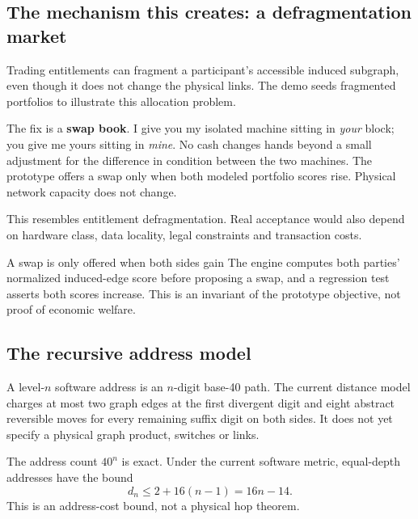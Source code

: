 \documentclass[11pt,letterpaper]{article}
\newcommand{\tagbox}[3]{\tikz[baseline=(X.base)]{\node[inner xsep=3.5pt,inner ysep=1.4pt,rounded corners=1.6pt,fill=#1,text=#2,font=\bfseries\sffamily\tiny] (X) {#3};}}
\newcommand{\MODELLED}{\tagbox{amberlite}{amber!55!black}{MODELLED}}
\begin{document}
\subsection{The mechanism this creates: a defragmentation market}

\begin{plainbox}[]
Trading entitlements can fragment a participant's accessible induced subgraph,
even though it does not change the physical links. The demo seeds fragmented
portfolios to illustrate this allocation problem. \MODELLED
\end{plainbox}

The fix is a \textbf{swap book}. I give you my isolated machine sitting in
\emph{your} block; you give me yours sitting in \emph{mine}. No cash changes
hands beyond a small adjustment for the difference in condition between the two
machines. The prototype offers a swap only when both modeled portfolio scores
rise. Physical network capacity does not change.

This resembles entitlement defragmentation. Real acceptance would also depend
on hardware class, data locality, legal constraints and transaction costs.

\begin{keybox}{A swap is only offered when both sides gain}
The engine computes both parties' normalized induced-edge score before
proposing a swap, and a regression test asserts both scores increase. This is
an invariant of the prototype objective, not proof of economic welfare.
\end{keybox}

\subsection{The recursive address model}

\begin{plainbox}[]
A level-$n$ software address is an $n$-digit base-40 path. The current distance
model charges at most two graph edges at the first divergent digit and eight
abstract reversible moves for every remaining suffix digit on both sides. It
does not yet specify a physical graph product, switches or links.
\end{plainbox}

The address count $40^n$ is exact. Under the current software metric, equal-depth
addresses have the bound
\[
d_n \leq 2+16(n-1)=16n-14.
\]
\MODELLED{} This is an address-cost bound, not a physical hop theorem.
\end{document}
